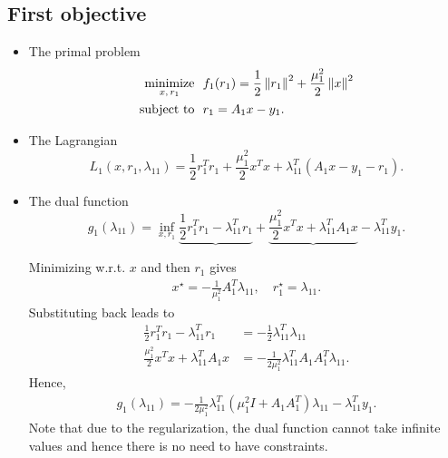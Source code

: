 \documentclass[12pt]{article}
\begin{document}
\subsection{First objective}

\begin{itemize}

\item The primal problem
  \begin{align*}
    \begin{split}
      \mathop{\mbox{minimize}}_{x, \, r_1} \ \  & f_1(r_1) = \frac{1}{2}\left\lVert r_1\right\rVert^2 + \frac{\mu_1^2}{2}\left\lVert x\right\rVert^2\\
      \mbox{subject to} \ \  & r_1 = A_1x - y_1.
    \end{split}
  \end{align*}

\item The Lagrangian
  \[
  L_1(x,r_1,\lambda_{11}) = \frac{1}{2}r_1^Tr_1 + \frac{\mu_1^2}{2} x^Tx + \lambda_{11}^T(A_1x - y_1 - r_1).
  \]

\item The dual function
%
\[
g_1(\lambda_{11}) = \inf_{x,r_1} \underbrace{\frac{1}{2}r_1^Tr_1 - \lambda_{11}^Tr_1} +
\underbrace{\frac{\mu_1^2}{2}x^Tx + \lambda_{11}^TA_1x} - \lambda_{11}^Ty_1.
\]

Minimizing w.r.t. $x$ and then $r_1$ gives
%
\begin{align} \label{eq.x_r}
x^{\star} = -\frac{1}{\mu_1^2}A_1^T\lambda_{11}, \quad r_1^{\star} = \lambda_{11}.
\end{align}
%
Substituting back leads to
%
\begin{align*}
\frac{1}{2}r_1^Tr_1 - \lambda_{11}^Tr_1 &= -\frac{1}{2}\lambda_{11}^T\lambda_{11} \\
\frac{\mu_1^2}{2} x^Tx + \lambda_{11}^TA_1x &= -\frac{1}{2\mu_1^2} \lambda_{11}^T A_1A_1^T \lambda_{11}.
\end{align*}
%
Hence,
%
\begin{align*}
g_1(\lambda_{11}) = -\frac{1}{2\mu_1^2}\lambda_{11}^T\left(\mu_1^2I+A_1A_1^T\right)\lambda_{11} - \lambda_{11}^Ty_1.
\end{align*}
%
Note that due to the regularization, the dual function cannot take infinite values and hence there
is no need to have constraints.


\end{itemize}
\end{document}
